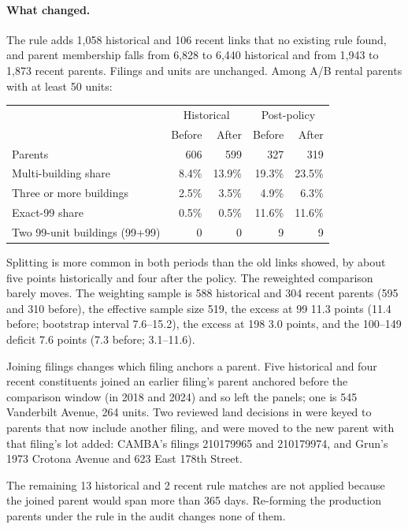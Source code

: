 \paragraph{What changed.} The rule adds 1,058 historical and 106 recent links
that no existing rule found, and parent membership falls from 6,828 to 6,440
historical and from 1,943 to 1,873 recent parents. Filings and units are
unchanged. Among A/B rental parents with at least 50 units:

\begin{center}
\small
\begin{tabular}{lrrrr}
\hline
& \multicolumn{2}{c}{Historical} & \multicolumn{2}{c}{Post-policy} \\
& Before & After & Before & After \\
\hline
Parents & 606 & 599 & 327 & 319 \\
Multi-building share & 8.4\% & 13.9\% & 19.3\% & 23.5\% \\
Three or more buildings & 2.5\% & 3.5\% & 4.9\% & 6.3\% \\
Exact-99 share & 0.5\% & 0.5\% & 11.6\% & 11.6\% \\
Two 99-unit buildings (99+99) & 0 & 0 & 9 & 9 \\
\hline
\end{tabular}
\end{center}

Splitting is more common in both periods than the old links showed, by about
five points historically and four after the policy. The reweighted
comparison barely moves. The weighting sample is 588 historical and 304 recent
parents (595 and 310 before), the effective sample size 519, the excess at 99
11.3 points (11.4 before; bootstrap interval 7.6--15.2), the excess at 198 3.0
points, and the 100--149 deficit 7.6 points (7.3 before; 3.1--11.6).

Joining filings changes which filing anchors a parent. Five historical and
four recent constituents joined an earlier filing's parent anchored before the
comparison window (in 2018 and 2024) and so left the panels; one is 545
Vanderbilt Avenue, 264 units. Two reviewed land decisions in
 were keyed to parents that now include another
filing, and were moved to the new parent with that filing's lot added: CAMBA's
filings 210179965 and 210179974, and Grun's 1973 Crotona Avenue and 623 East
178th Street.

The remaining 13 historical and 2 recent rule matches are not applied because
the joined parent would span more than 365 days. Re-forming the production
parents under the rule in the audit changes none of them.

